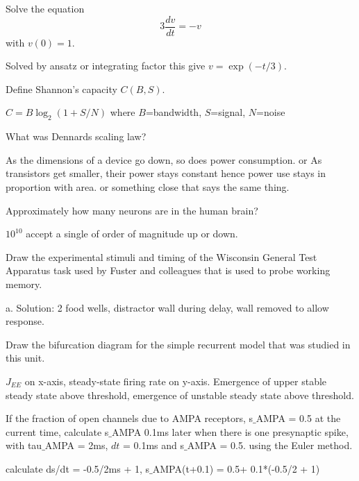 \documentclass{cs-uob-exam}
\begin{document}
\begin{questions}

\question Solve the equation
$$3\frac{dv}{dt}=-v$$
with $v(0)=1$.

\begin{solution}
Solved by ansatz or integrating factor this give $v=\exp{(-t/3)}$.
\end{solution}


\question Define Shannon's capacity $C(B,S)$. 
\begin{solution}
  $C = B \log_2 (1+S/N)$ where $B$=bandwidth, $S$=signal, $N$=noise
\end{solution}

\question What was Dennards scaling law?
\begin{solution}
As the dimensions of a device go down, so does power consumption.
or
As transistors get smaller, their power stays constant hence power use stays in proportion with area.
or
something close that says the same thing.
\end{solution}

\question Approximately how many neurons are in the human brain?
\begin{solution}
$10^{10}$ accept a single of order of magnitude up or  down.
\end{solution}


\question Draw the experimental stimuli and timing of the Wisconsin General Test Apparatus task used by Fuster and colleagues that is used to probe working memory.
\begin{solution}
  a. Solution: 2 food wells, distractor wall during delay, wall removed to allow response.
\end{solution}

\question
Draw the bifurcation diagram for the simple recurrent model that was studied in this unit.
\begin{solution}
$J_{EE}$ on x-axis, steady-state firing rate on y-axis. Emergence of upper stable steady state above threshold, emergence of unstable steady state above threshold.
  \end{solution}     
\question
If the fraction of open channels due to AMPA receptors, s$\_$AMPA = 0.5 at the current time, calculate s$\_$AMPA 0.1ms later when there is one presynaptic spike, with tau$\_$AMPA = 2ms, $dt$ = 0.1ms and s$\_$AMPA = 0.5. using the Euler method.
\begin{solution}
calculate ds/dt = -0.5/2ms + 1, s$\_$AMPA(t+0.1) = 0.5+ 0.1*(-0.5/2 + 1)
\end{solution}


\end{questions}
\end{document}
